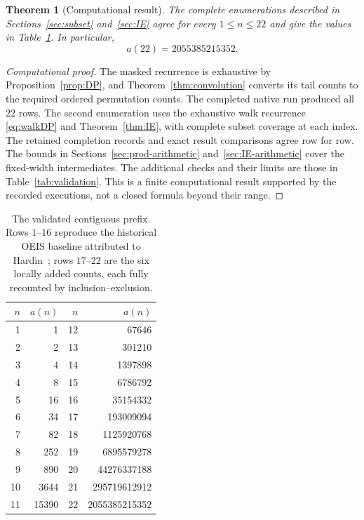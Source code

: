 \documentclass[11pt]{article}
\newtheorem{theorem}{Theorem}[section]
\theoremstyle{definition}
\theoremstyle{remark}
\begin{document}
\begin{theorem}[Computational result]
\label{thm:result}
The complete enumerations described in Sections~\ref{sec:subset}
and~\ref{sec:IE} agree for every $1\leq n\leq22$ and give the values
in Table~\ref{tab:counts}. In particular,
\[
 a(22)=2055385215352.
\]
\end{theorem}
\begin{proof}[Computational proof]
The masked recurrence is exhaustive by Proposition~\ref{prop:DP}, and
Theorem~\ref{thm:convolution} converts its tail counts to the required
ordered permutation counts. The completed native run produced all $22$
rows. The second enumeration uses the exhaustive walk recurrence
\eqref{eq:walkDP} and Theorem~\ref{thm:IE}, with complete subset coverage
at each index. The retained completion records and exact result comparisons
agree row for row. The bounds in Sections~\ref{sec:prod-arithmetic}
and~\ref{sec:IE-arithmetic} cover the fixed-width intermediates.
The additional checks and their limits are those in
Table~\ref{tab:validation}. This is a finite computational result supported
by the recorded executions, not a closed formula beyond their range.
\end{proof}

\begin{table}[htbp]
\centering
\begin{tabular}{@{}rr@{\qquad}rr@{}}
\toprule
$n$ & $a(n)$ & $n$ & $a(n)$ \\
\midrule
1 & 1 & 12 & 67646 \\
2 & 2 & 13 & 301210 \\
3 & 4 & 14 & 1397898 \\
4 & 8 & 15 & 6786792 \\
5 & 16 & 16 & 35154332 \\
6 & 34 & 17 & 193009094 \\
7 & 82 & 18 & 1125920768 \\
8 & 252 & 19 & 6895579278 \\
9 & 890 & 20 & 44276337188 \\
10 & 3644 & 21 & 295719612912 \\
11 & 15390 & 22 & 2055385215352 \\
\bottomrule
\end{tabular}
\caption{The validated contiguous prefix. Rows $1$--$16$ reproduce the
historical OEIS baseline attributed to Hardin~\cite{hardin}; rows
$17$--$22$ are the six locally added counts, each fully recounted by
inclusion--exclusion.}
\label{tab:counts}
\end{table}
\end{document}
